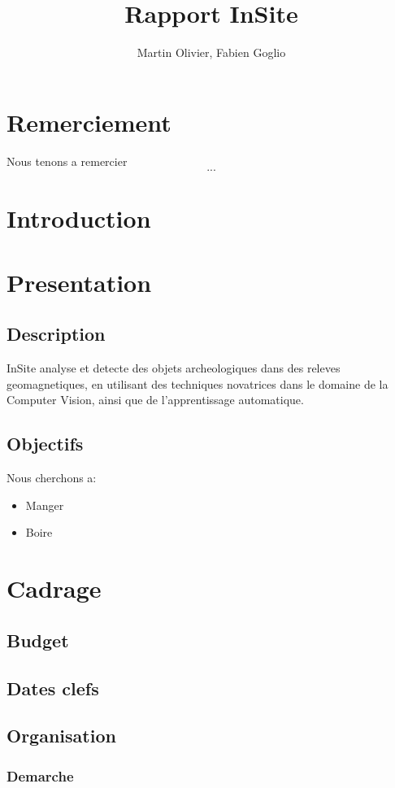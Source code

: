 \documentclass[a4paper, 12pt, titlepage, oneside]{article}
\author{Martin Olivier, Fabien Goglio}
\title{Rapport InSite}
\begin{document}
\maketitle

\newpage
	\tableofcontents
\newpage
\cleardoublepage
{}
\section{Remerciement}
	Nous tenons a remercier \[...\]
	\newpage
\section{Introduction}
	\newpage
\section{Presentation}
	\subsection{Description}
		InSite analyse et detecte des objets archeologiques dans des releves geomagnetiques, en utilisant des techniques novatrices dans le domaine de
		la Computer Vision, ainsi que de l'apprentissage automatique.
	\subsection{Objectifs}
	Nous cherchons a:
	\begin{itemize}
		\item Manger 
		\item Boire
	\end{itemize}

	\newpage

\section{Cadrage}
	\subsection{Budget}
	\subsection{Dates clefs}
	\subsection{Organisation}
	\subsubsection{Demarche}
\end{document}
